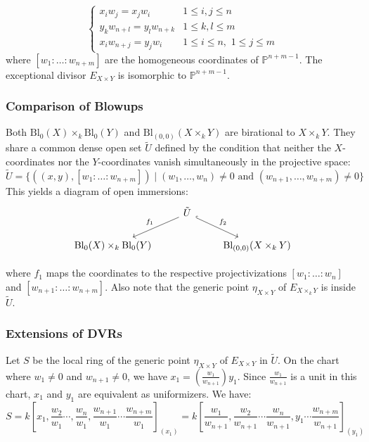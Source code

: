 $$\begin{cases}
x_i w_j = x_j w_i & 1 \le i, j \le n \\
y_k w_{n+l} = y_l w_{n+k} & 1 \le k, l \le m \\
x_i w_{n+j} = y_j w_i & 1 \le i \le n, \,\, 1 \le j \le m
\end{cases}$$
where $[w_1 : \dots : w_{n+m}]$ are the homogeneous coordinates of $\mathbb{P}^{n+m-1}$. The exceptional divisor $E_{X \times Y}$ is isomorphic to $\mathbb{P}^{n+m-1}$.

\subsubsection*{Comparison of Blowups}

Both $\text{Bl}_0(X) \times_k \text{Bl}_0(Y)$ and $\text{Bl}_{(0,0)}(X \times_k Y)$ are birational to $X \times_k Y$.
They share a common dense open set $\tilde{U}$ defined by the condition that neither the $X$-coordinates nor the $Y$-coordinates vanish simultaneously in the projective space:
$$\tilde{U} = \{ ((x,y), [w_1: \dots : w_{n+m}]) \mid (w_1, \dots, w_n) \neq 0 \text{ and } (w_{n+1}, \dots, w_{n+m}) \neq 0 \}$$This yields a diagram of open immersions:
$$
   \begin{tikzcd}
        & \tilde{U} \arrow[dl, "f_1"'] \arrow[dr, "f_2", hook] & \\
        \text{Bl}_0(X) \times_k \text{Bl}_0(Y) & & \text{Bl}_{(0,0)}(X \times_k Y)
    \end{tikzcd}
$$

    where $f_1$ maps the coordinates to the respective projectivizations $[w_1: \dots : w_n]$ and $[w_{n+1}: \dots : w_{n+m}]$.
    Also note that the generic point $\eta_{X \times Y}$  of $E_{X \times_k Y}$ is inside $\tilde{U}$.

\subsubsection*{Extensions of DVRs}
Let $S$ be the local ring of the generic point $\eta_{X\times Y}$ of $E_{X \times Y}$ in $\tilde{U}$.
On the chart where $w_1 \neq 0$ and $w_{n+1} \neq 0$, we have
$x_1 = (\frac{w_1}{w_{n+1}}) y_1$.
Since $\frac{w_1}{w_{n+1}}$ is a unit in this chart, $x_1$ and $y_1$ are equivalent as uniformizers.
We have:
$$
S=k\left[x_1, \frac{w_2}{w_1} \cdots, \frac{w_n}{w_1}, \frac{w_{n+1}}{w_1} \cdots \frac{w_{n+m}}{w_1}\right]_{(x_1)} =
k\left[\frac{w_1}{w_{n+1}}, \frac{w_2}{w_{n+1}} \cdots \frac{w_n}{w_{n+1}}, y_1 \cdots \frac{w_{n+m}}{w_{n+1}}\right]_{(y_1)}
$$

